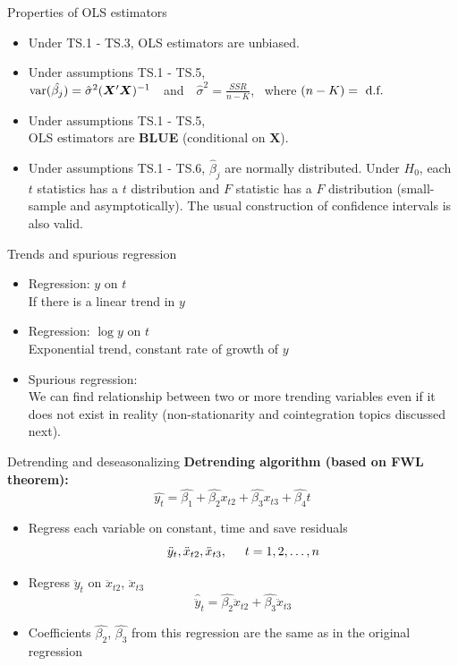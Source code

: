 \documentclass{beamer}
\begin{document}
\begin{frame}{Properties of OLS estimators}
\begin{itemize}
\item Under TS.1 - TS.3, OLS estimators are unbiased.
\medskip
\item Under assumptions TS.1 - TS.5, \\ \medskip
$\textnormal{var}(\hat{\beta_j})=\hat{\sigma}^2(\bm{X}^{\prime}\bm{X})^{-1}$~~and~~$\hat{\sigma}^2=\frac{SSR}{n-K}$, ~where $(n-K)=\textnormal{~d.f.}$
\medskip
\item Under assumptions TS.1 - TS.5, \\ \medskip OLS estimators are \textbf{BLUE} (conditional on $\boldsymbol{X}$).
\medskip
\item Under assumptions TS.1 - TS.6, $\hat{\beta}_j$ are normally distributed. Under $H_0$, each $t$ statistics has a $t$ distribution and $F$ statistic has a $F$ distribution (small-sample and asymptotically). The usual construction of confidence intervals is also valid. 
\end{itemize}
\end{frame}
\begin{frame}{Trends and spurious regression}
\begin{itemize}
\item Regression: $y$ on $t$ \\ If there is a linear trend in $y$
\vspace{0.5cm}
\item Regression: $\log{y}$ on $t$ \\ Exponential trend, constant rate of growth of $y$
\vspace{0.5cm}
\item Spurious regression: \\ \medskip We can find relationship between two or more trending variables even if it does not exist in reality (non-stationarity and cointegration topics discussed next).
\end{itemize}
\end{frame}
\begin{frame}{Detrending and deseasonalizing}
\textbf{Detrending algorithm (based on FWL theorem):}
$$\hat{y_t}=\hat{\beta_1}+\hat{\beta_2}x_{t2}+\hat{\beta_3}x_{t3}+\hat{\beta_4}t$$
\begin{itemize}
\item Regress each variable on constant, time and save residuals $$\ddot{y}_{t}, \ddot{x}_{t2}, \ddot{x}_{t3}, \hspace{0.5cm} t=1,2,\dots, n$$
\item Regress $\ddot{y}_{t}$ on $\ddot{x}_{t2}$, $\ddot{x}_{t3}$
$$\hat{\ddot{y}}_{t}=\hat{\beta_2}\ddot{x}_{t2}+\hat{\beta_3}\ddot{x}_{t3}$$
\item Coefficients $\hat{\beta_2}$, $\hat{\beta_3}$ from this regression are the same as in the original regression 
\end{itemize}
\end{frame}
\end{document}
